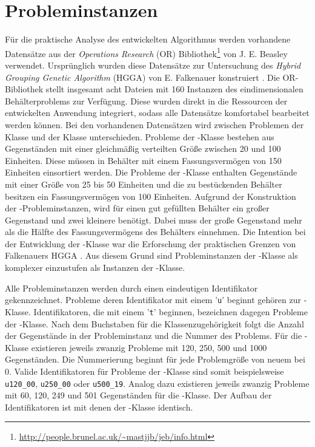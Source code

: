     \section{Probleminstanzen}
    Für die praktische Analyse des entwickelten Algorithmus werden vorhandene Datensätze aus der \textit{Operations Research} (OR) Bibliothek\footnote{\url{http://people.brunel.ac.uk/~mastjjb/jeb/info.html}} von J. E. Beasley verwendet. Ursprünglich wurden diese Datensätze zur Untersuchung des \textit{Hybrid Grouping Genetic Algorithm} (HGGA) von E. Falkenauer konstruiert \parencite{Falkenauer:1996}. Die OR-Bibliothek stellt insgesamt acht Dateien mit 160 Instanzen des eindimensionalen Behälterproblems zur Verfügung. Diese wurden direkt in die Ressourcen der entwickelten Anwendung integriert, sodass alle Datensätze komfortabel bearbeitet werden können. Bei den vorhandenen Datensätzen wird zwischen Problemen der Klasse \uniform und der Klasse \triplets unterschieden. Probleme der \uniform-Klasse bestehen aus Gegenständen mit einer gleichmäßig verteilten Größe zwischen 20 und 100 Einheiten. Diese müssen in Behälter mit einem Fassungsvermögen von 150 Einheiten einsortiert werden. Die Probleme der \triplets-Klasse enthalten Gegenstände mit einer Größe von 25 bis 50 Einheiten und die zu bestückenden Behälter besitzen ein Fassungsvermögen von 100 Einheiten. Aufgrund der Konstruktion der \triplets-Probleminstanzen, wird für einen gut gefüllten Behälter ein großer Gegenstand und zwei kleinere benötigt. Dabei muss der große Gegenstand mehr als die Hälfte des Fassungsvermögens des Behälters einnehmen. Die Intention bei der Entwicklung der \triplets-Klasse war die Erforschung der praktischen Grenzen von Falkenauers HGGA \parencite[17]{Falkenauer:1996}. Aus diesem Grund sind Probleminstanzen der \triplets-Klasse als komplexer einzustufen als Instanzen der \uniform-Klasse.

    Alle Probleminstanzen werden durch einen eindeutigen Identifikator gekennzeichnet. Probleme deren Identifikator mit einem '\texttt{u}' beginnt gehören zur \uniform-Klasse. Identifikatoren, die mit einem '\texttt{t}' beginnen, bezeichnen dagegen Probleme der \triplets-Klasse. Nach dem Buchstaben für die Klassenzugehörigkeit folgt die Anzahl der Gegenstände in der Probleminstanz und die Nummer des Problems. Für die \uniform-Klasse existieren jeweils zwanzig Probleme mit 120, 250, 500 und 1000 Gegenständen. Die Nummerierung beginnt für jede Problemgröße von neuem bei 0. Valide Identifikatoren für Probleme der \uniform-Klasse sind somit beispielsweise \texttt{u120\_00}, \texttt{u250\_00} oder \texttt{u500\_19}. Analog dazu existieren jeweils zwanzig Probleme mit 60, 120, 249 und 501 Gegenständen für die \triplets-Klasse. Der Aufbau der Identifikatoren ist mit denen der \uniform-Klasse identisch.

